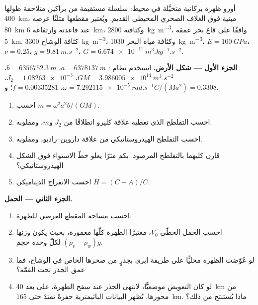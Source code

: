 \begin{problem}
\label{pb:b3:gravity-geodesy:1}
أورو ظهرة بركانية متخيَّلة في محيط: سلسلة مستقيمة من براكين متلاحمة
طولها \qty{400}{km}، مبنية فوق الغلاف الصخري المحيطي القديم. ويُعتبر مقطعها
مثلثًا عرضه \qty{80}{km} عند قاعدته
وارتفاعه \qty{6}{km}، وكثافته \qty{2800}{kg.m^{-3}}، واقفًا على قاع بحر
عمقه \qty{5}{km}. كثافة الوشاح \qty{3300}{kg.m^{-3}}، وكثافة مياه البحر
\qty{1030}{kg.m^{-3}}، $E = \qty{100}{GPa}$، $\nu = 0.25$، $g =
\qty{9.81}{m.s^{-2}}$، $G = \qty{6.674e-11}{m^3.kg^{-1}.s^{-2}}$.

\medskip
\noindent\textbf{الجزء الأول --- شكل الأرض.} استخدم نظام
: $a = \qty{6378137}{m}$، $b = \qty{6356752.3}{m}$،
$GM = \qty{3.986005e14}{m^3.s^{-2}}$، $J_2 = \num{1.08263e-3}$،
$\omega = \qty{7.292115e-5}{rad.s^{-1}}$، $f = \num{0.00335281}$؛
و$C/(Ma^2) = \num{0.3308}$.
\begin{enumerate}
  \item احسب $m = \omega^2a^2b/(GM)$.
  \item احسب التفلطح الذي تعطيه علاقة كليرو انطلاقًا من $J_2$
        و$m$، ومقلوبه.
  \item احسب التفلطح الهيدروستاتيكي من علاقة داروين--راديو،
        ومقلوبه.
  \item قارن كليهما بالتفلطح المرصود. بكم مترًا يعلو
        خطّ الاستواء فوق الشكل الهيدروستاتيكي؟
  \item احسب الانفراج الديناميكي $H = (C - A)/C$.
\end{enumerate}

\noindent\textbf{الجزء الثاني --- الحمل.}
\begin{enumerate}[resume]
  \item احسب مساحة المقطع العرضي للظهرة.
  \item احسب الحمل الخطّي $V_0$، معتبرًا الظهرة كلّها مغمورة، بحيث
        يكون وزنها $(\rho_v - \rho_w)g$ لكلّ وحدة حجم.
  \item لو عُوّضت الظهرة محليًّا على طريقة إيري بجذرٍ من
        صخرها الخاص في الوشاح، فما عمق الجذر تحت
        القمّة؟
  \item لو كان التعويض موضعيًّا، لانتهى الجذر عند سفح الظهرة،
        على بعد \qty{40}{km} من محورها. تُظهر البيانات الباثيمترية حفرةً تمتدّ حتى
        \qty{165}{km}. ماذا يُستنتج من ذلك؟
\end{enumerate}


\end{problem}
